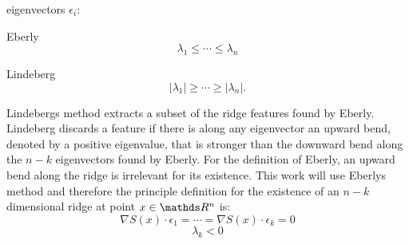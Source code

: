 eigenvectors $\epsilon_i$:\\
\begin{inparaenum}[]
  \item Eberly
  \begin{equation}\label{eq:Eberly}
   \lambda_1 \leq \cdots \leq \lambda_n
  \end{equation}
  \item Lindeberg
  \begin{equation}
    \lvert \lambda_1 \rvert \geq \cdots \geq \lvert \lambda_n \rvert.
  \end{equation}
\end{inparaenum}
\noindent Lindebergs method extracts a subset of the ridge features
found by Eberly. Lindeberg discards a feature if there is along any
eigenvector an upward bend, denoted by a positive eigenvalue, that is
stronger than the downward bend along the $n-k$ eigenvectors found by
Eberly. For the definition of Eberly, an upward bend along the ridge is
irrelevant for its existence. This work will use Eberlys method and
therefore the principle definition for the existence of an $n-k$
dimensional ridge at point $x \in \real^n$ is:\\

\begin{equation}\label{eq:ridgeDot}
  \nabla S(x) \cdot \epsilon_1 = \cdots = \nabla S(x) \cdot \epsilon_{k} = 0
\end{equation}
\begin{equation}\label{eq:ridgeEV}
  \lambda_k < 0
\end{equation}

